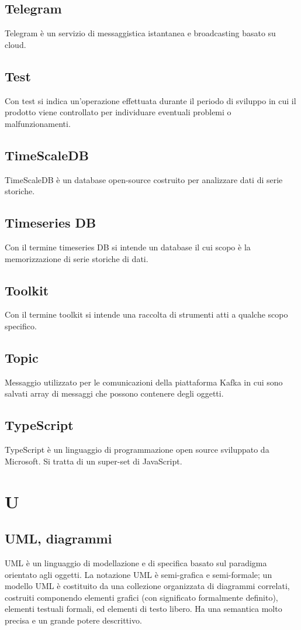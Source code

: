 \subsection{Telegram}  Telegram è un servizio di messaggistica istantanea e broadcasting basato su cloud.
\subsection{Test}  Con test si indica un'operazione effettuata durante il periodo di sviluppo in cui il prodotto viene controllato per individuare eventuali problemi o malfunzionamenti.
\subsection{TimeScaleDB}  TimeScaleDB è un database open-source costruito per analizzare dati di serie storiche.
\subsection{Timeseries DB}  Con il termine timeseries DB si intende un database il cui scopo è la memorizzazione di serie storiche di dati.
\subsection{Toolkit}  Con il termine toolkit si intende una raccolta di strumenti atti a qualche scopo specifico.
\subsection{Topic}  Messaggio utilizzato per le comunicazioni della piattaforma Kafka in cui sono salvati array di messaggi che possono contenere degli oggetti.
\subsection{TypeScript}  TypeScript è un linguaggio di programmazione open source sviluppato da Microsoft. Si tratta di un super-set di JavaScript.

\newpage \section{U}
\subsection{UML, diagrammi} UML è un linguaggio di modellazione e di specifica basato sul paradigma orientato agli oggetti. La notazione UML è semi-grafica e semi-formale; un modello UML è costituito da una collezione organizzata di diagrammi correlati, costruiti componendo elementi grafici (con significato formalmente definito), elementi testuali formali, ed elementi di testo libero. Ha una semantica molto precisa e un grande potere descrittivo. 
